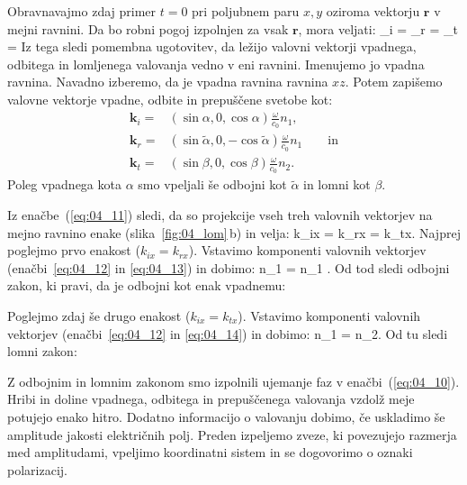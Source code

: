 Obravnavajmo zdaj primer $t=0$ pri poljubnem paru $x,y$ oziroma vektorju $\mathbf{r}$
v mejni ravnini. Da bo robni pogoj izpolnjen za vsak $\mathbf{r}$,
mora veljati:
\beq
{}_i\cdot {} = _r\cdot {} = 
_t\cdot {} = 
\label{eq:04_11}
\eeq
Iz tega sledi pomembna ugotovitev, da ležijo valovni vektorji vpadnega, odbitega
in lomljenega valovanja vedno v eni ravnini. Imenujemo jo vpadna ravnina. 
Navadno izberemo, da je vpadna ravnina ravnina $xz$. Potem zapišemo 
valovne vektorje vpadne, odbite in prepuščene svetobe kot:
\begin{align}
\mathbf{k}_i  =& \left( \sin\alpha, 0, \cos \alpha\right) \frac{\omega}{c_0} n_1, \label{eq:04_12}\\
\mathbf{k}_r  =& \left( \sin\tilde{\alpha}, 0, -\cos \tilde{\alpha}\right) 
\frac{\omega}{c_0} n_1\label{eq:04_13} \qquad \mathrm{in}\\
\mathbf{k}_t  =& \left( \sin\beta, 0, \cos \beta\right) \frac{\omega}{c_0} n_2.\label{eq:04_14}
\end{align}
Poleg vpadnega kota $\alpha$ smo vpeljali še odbojni kot $\tilde{\alpha}$ in lomni
kot $\beta$. 

Iz enačbe~(\ref{eq:04_11}) sledi, da so projekcije vseh treh valovnih vektorjev na mejno
ravnino enake (slika~\ref{fig:04_lom}\,b) in velja:
\beq
k_{ix} = k_{rx} = k_{tx}.
\label{eq:04_15}
\eeq
Najprej poglejmo prvo enakost ($k_{ix} = k_{rx}$). Vstavimo komponenti valovnih
vektorjev (enačbi~\ref{eq:04_12} in \ref{eq:04_13}) in dobimo:
\beq
{} n_1 \sin \alpha  =   n_1 \sin\tilde{\alpha}.
\label{eq:04_16}
\eeq
Od tod sledi odbojni zakon, ki pravi, da je odbojni kot enak vpadnemu:

Poglejmo zdaj še drugo enakost ($k_{ix} = k_{tx}$). Vstavimo komponenti
valovnih vektorjev (enačbi~\ref{eq:04_12} in \ref{eq:04_14}) in dobimo:
\beq
{} n_1 \sin \alpha  =  n_2\sin\beta.
\label{eq:04_17}
\eeq
Od tu sledi lomni zakon:

Z odbojnim in lomnim zakonom smo izpolnili ujemanje faz v enačbi~(\ref{eq:04_10}). 
Hribi in doline vpadnega, odbitega in prepuščenega valovanja vzdolž meje 
potujejo enako hitro. Dodatno informacijo o valovanju dobimo, če
uskladimo še amplitude jakosti električnih polj. Preden izpeljemo
zveze, ki povezujejo razmerja med amplitudami, vpeljimo koordinatni sistem
in se dogovorimo o oznaki polarizacij.

